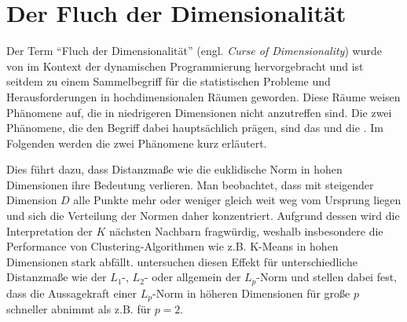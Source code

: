 \section{Der Fluch der Dimensionalität}
\label{ch:Dimensionsreduktion:FluchDerDim}

Der Term \enquote{Fluch der Dimensionalität} (engl. \textit{Curse of Dimensionality}) wurde von
\textcite{Bellman.1957} im Kontext der dynamischen Programmierung hervorgebracht und ist seitdem zu
einem Sammelbegriff für die statistischen Probleme und Herausforderungen in hochdimensionalen
Räumen geworden. Diese Räume weisen Phänomene auf, die in niedrigeren Dimensionen nicht anzutreffen
sind. Die zwei Phänomene, die den Begriff dabei hauptsächlich prägen, sind das  und die  \parencite[6 -- 9]{Lee.2007}. Im Folgenden werden die zwei Phänomene kurz erläutert.


Dies führt dazu, dass Distanzmaße wie die euklidische Norm in hohen Dimensionen ihre Bedeutung
verlieren. Man beobachtet, dass mit steigender Dimension $D$ alle Punkte mehr oder weniger gleich
weit weg vom Ursprung liegen und sich die Verteilung der Normen daher konzentriert. Aufgrund dessen
wird die Interpretation der $K$ nächsten Nachbarn fragwürdig, weshalb insbesondere die Performance
von Clustering-Algorithmen wie z.B. K-Means in hohen Dimensionen stark abfällt.
\textcite{Aggarwal.2001} untersuchen diesen Effekt für unterschiedliche Distanzmaße wie der $L_1$-,
$L_2$- oder allgemein der $L_p$-Norm und stellen dabei fest, dass die Aussagekraft einer $L_p$-Norm
in höheren Dimensionen für große $p$ schneller abnimmt als z.B. für $p = 2$.

